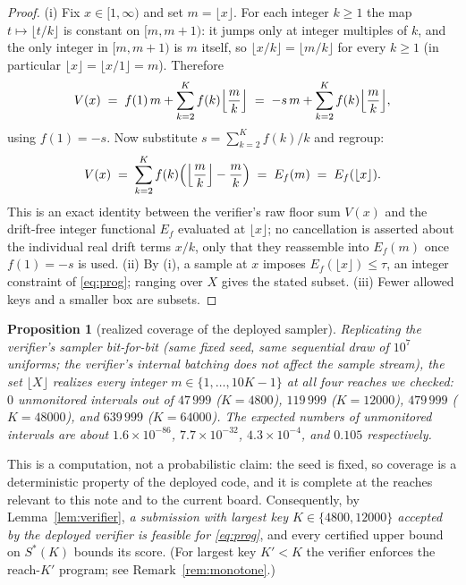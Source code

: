 \documentclass[11pt]{article}
\newtheorem{proposition}[theorem]{Proposition}
\theoremstyle{remark}
\newcommand{\Sstar}{S^{*}}
\begin{document}
\begin{proof}
(i) Fix $x \in [1,\infty)$ and set $m = \lfloor x \rfloor$. For each
integer $k \ge 1$ the map $t \mapsto \lfloor t/k \rfloor$ is constant on
$[m, m+1)$: it jumps only at integer multiples of $k$, and the only integer
in $[m, m+1)$ is $m$ itself, so $\lfloor x/k \rfloor = \lfloor m/k \rfloor$
for every $k \ge 1$ (in particular $\lfloor x \rfloor = \lfloor x/1 \rfloor
= m$). Therefore
\[
V(x) \;=\; f(1)\,m + \sum_{k=2}^{K} f(k)\Bigl\lfloor \frac{m}{k}\Bigr\rfloor
\;=\; -s\,m + \sum_{k=2}^{K} f(k)\Bigl\lfloor \frac{m}{k}\Bigr\rfloor ,
\]
using $f(1) = -s$. Now substitute $s = \sum_{k=2}^{K} f(k)/k$ and regroup:
\[
V(x) \;=\; \sum_{k=2}^{K} f(k)\Bigl(\Bigl\lfloor \frac{m}{k}\Bigr\rfloor
- \frac{m}{k}\Bigr) \;=\; E_f(m) \;=\; E_f(\lfloor x \rfloor) .
\]
This is an exact identity between the verifier's raw floor sum $V(x)$ and
the drift-free integer functional $E_f$ evaluated at $\lfloor x \rfloor$;
no cancellation is asserted about the individual real drift terms $x/k$,
only that they reassemble into $E_f(m)$ once $f(1) = -s$ is used. (ii) By
(i), a sample at $x$ imposes $E_f(\lfloor x\rfloor) \le \tau$, an integer
constraint of \eqref{eq:prog}; ranging over $X$ gives the stated subset.
(iii) Fewer allowed keys and a smaller box are subsets.
\end{proof}

\begin{proposition}[realized coverage of the deployed sampler]
\label{prop:coverage}
Replicating the verifier's sampler bit-for-bit (same fixed seed, same
sequential draw of $10^7$ uniforms; the verifier's internal batching does
not affect the sample stream), the set
$\lfloor X \rfloor$ realizes \emph{every} integer $m \in \{1, \dots,
10K-1\}$ at all four reaches we checked: $0$ unmonitored intervals out of
$47\,999$ ($K = 4800$), $119\,999$ ($K = 12000$), $479\,999$
($K = 48000$), and $639\,999$ ($K = 64000$). The expected numbers of
unmonitored intervals are about $1.6\times10^{-86}$, $7.7\times10^{-32}$,
$4.3\times10^{-4}$, and $0.105$ respectively.
\end{proposition}

This is a computation, not a probabilistic claim: the seed is fixed, so
coverage is a deterministic property of the deployed code, and it is
complete at the reaches relevant to this note and to the current board.
Consequently, by Lemma~\ref{lem:verifier}, \emph{a submission with largest
key $K \in \{4800, 12000\}$ accepted by the deployed verifier is feasible
for \eqref{eq:prog}}, and every certified upper bound on $\Sstar(K)$
bounds its score. (For largest key $K' < K$ the verifier enforces the
reach-$K'$ program; see Remark~\ref{rem:monotone}.)
\end{document}
